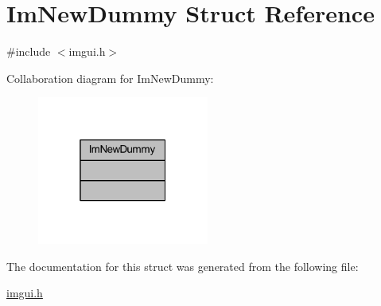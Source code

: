 \hypertarget{struct_im_new_dummy}{}\section{Im\+New\+Dummy Struct Reference}
\label{struct_im_new_dummy}


{\ttfamily \#include $<$imgui.\+h$>$}



Collaboration diagram for Im\+New\+Dummy\+:
\nopagebreak
\begin{figure}[H]
\begin{center}
\leavevmode
\includegraphics[width=160pt]{struct_im_new_dummy__coll__graph}
\end{center}
\end{figure}


The documentation for this struct was generated from the following file\+:\begin{DoxyCompactItemize}
\item 
\mbox{\hyperlink{imgui_8h}{imgui.\+h}}\end{DoxyCompactItemize}
